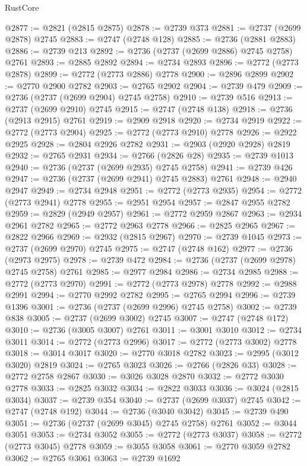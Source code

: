 \begin{lexlean}{RustCore}
\begin{coremodule}
@2877 := @2821 (@2815 @2875)
@2878 := @2739 @373
@2881 := @2737 (@2699 @2878) @2745
@2883 := @2747 (@2748 @128)
@2885 := @2736 (@2881 @2883)
@2886 := @2739 @213
@2892 := @2736 (@2737 (@2699 @2886) @2745 @2758) @2761
@2893 := @2885 @2892
@2894 := @2734 @2893
@2896 := @2772 (@2773 @2878)
@2899 := @2772 (@2773 @2886) @2778
@2900 := @2896 @2899
@2902 := @2770 @2900 @2782
@2903 := @2765 @2902
@2904 := @2739 @479
@2909 := @2736 (@2737 (@2699 @2904) @2745 @2758)
@2910 := @2739 @516
@2913 := @2737 (@2699 @2910) @2745
@2915 := @2747 (@2748 @138)
@2918 := @2736 (@2913 @2915) @2761
@2919 := @2909 @2918
@2920 := @2734 @2919
@2922 := @2772 (@2773 @2904)
@2925 := @2772 (@2773 @2910) @2778
@2926 := @2922 @2925
@2928 := @2804 @2926 @2782
@2931 := @2903 (@2920 @2928) @2819
@2932 := @2765 @2931
@2934 := @2766 (@2826 @28)
@2935 := @2739 @1013
@2940 := @2736 (@2737 (@2699 @2935) @2745 @2758)
@2941 := @2739 @426
@2947 := @2736 (@2737 (@2699 @2941) @2745 @2883) @2761
@2948 := @2940 @2947
@2949 := @2734 @2948
@2951 := @2772 (@2773 @2935)
@2954 := @2772 (@2773 @2941) @2778
@2955 := @2951 @2954
@2957 := @2847 @2955 @2782
@2959 := @2829 (@2949 @2957)
@2961 := @2772 @2959 @2867
@2963 := @2934 @2961 @2782
@2965 := @2772 @2963 @2778
@2966 := @2825 @2965
@2967 := @2822 @2966
@2969 := @2932 (@2815 @2967)
@2970 := @2739 @1045
@2973 := @2737 (@2699 @2970) @2745
@2975 := @2747 (@2748 @162)
@2977 := @2736 (@2973 @2975)
@2978 := @2739 @472
@2984 := @2736 (@2737 (@2699 @2978) @2745 @2758) @2761
@2985 := @2977 @2984
@2986 := @2734 @2985
@2988 := @2772 (@2773 @2970)
@2991 := @2772 (@2773 @2978) @2778
@2992 := @2988 @2991
@2994 := @2770 @2992 @2782
@2995 := @2765 @2994
@2996 := @2739 @1396
@3001 := @2736 (@2737 (@2699 @2996) @2745 @2758)
@3002 := @2739 @838
@3005 := @2737 (@2699 @3002) @2745
@3007 := @2747 (@2748 @172)
@3010 := @2736 (@3005 @3007) @2761
@3011 := @3001 @3010
@3012 := @2734 @3011
@3014 := @2772 (@2773 @2996)
@3017 := @2772 (@2773 @3002) @2778
@3018 := @3014 @3017
@3020 := @2770 @3018 @2782
@3023 := @2995 (@3012 @3020) @2819
@3024 := @2765 @3023
@3026 := @2766 (@2826 @33)
@3028 := @2772 @2758 @2867
@3030 := @3026 @3028 @2870
@3032 := @2772 @3030 @2778
@3033 := @2825 @3032
@3034 := @2822 @3033
@3036 := @3024 (@2815 @3034)
@3037 := @2739 @354
@3040 := @2737 (@2699 @3037) @2745
@3042 := @2747 (@2748 @192)
@3044 := @2736 (@3040 @3042)
@3045 := @2739 @490
@3051 := @2736 (@2737 (@2699 @3045) @2745 @2758) @2761
@3052 := @3044 @3051
@3053 := @2734 @3052
@3055 := @2772 (@2773 @3037)
@3058 := @2772 (@2773 @3045) @2778
@3059 := @3055 @3058
@3061 := @2770 @3059 @2782
@3062 := @2765 @3061
@3063 := @2739 @1692

\end{coremodule}
\end{lexlean}
